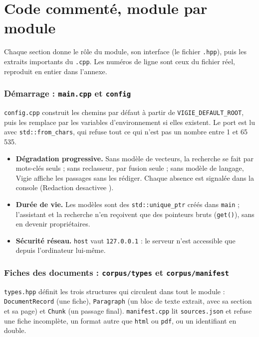 \documentclass[11pt,a4paper]{article}
\newcommand{\fichier}[1]{\texttt{#1}}
\begin{document}
\part{Code commenté, module par module}

Chaque section donne le rôle du module, son interface (le fichier \texttt{.hpp}), puis les extraits importants du \texttt{.cpp}. Les numéros de ligne sont ceux du fichier réel, reproduit en entier dans l'annexe.

\section{Démarrage : \texttt{main.cpp} et \texttt{config}}

\fichier{config.cpp} construit les chemins par défaut à partir de \texttt{VIGIE\_DEFAULT\_ROOT}, puis les remplace par les variables d'environnement si elles existent. Le port est lu avec \texttt{std::from\_chars}, qui refuse tout ce qui n'est pas un nombre entre 1 et 65\,535.


\begin{itemize}
  \item \textbf{Dégradation progressive.} Sans modèle de vecteurs, la recherche se fait par mots-clés seuls ; sans reclasseur, par fusion seule ; sans modèle de langage, Vigie affiche les passages sans les rédiger. Chaque absence est signalée dans la console (\og Redaction desactivee \fg).
  \item \textbf{Durée de vie.} Les modèles sont des \texttt{std::unique\_ptr} créés dans \texttt{main} ; l'assistant et la recherche n'en reçoivent que des pointeurs bruts (\texttt{get()}), sans en devenir propriétaires.
  \item \textbf{Sécurité réseau.} \texttt{host} vaut \texttt{127.0.0.1} : le serveur n'est accessible que depuis l'ordinateur lui-même.
\end{itemize}

\section{Fiches des documents : \texttt{corpus/types} et \texttt{corpus/manifest}}

\fichier{types.hpp} définit les trois structures qui circulent dans tout le module : \texttt{DocumentRecord} (une fiche), \texttt{Paragraph} (un bloc de texte extrait, avec sa section et sa page) et \texttt{Chunk} (un passage final). \fichier{manifest.cpp} lit \fichier{sources.json} et refuse une fiche incomplète, un format autre que \texttt{html} ou \texttt{pdf}, ou un identifiant en double.
\end{document}
